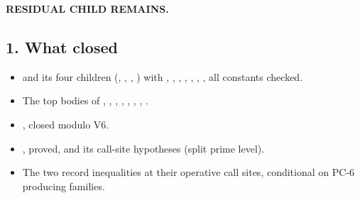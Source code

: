 \documentclass[11pt]{article}
\newcommand{\PC}[1]{\textsf{PC-#1}}
\begin{document}
\textbf{RESIDUAL CHILD REMAINS.}

\subsection*{1. What closed}
\begin{itemize}[leftmargin=*]
\item {} and its four children (, , , ) with , , , , , , , all constants checked.
\item The top bodies of , , , , , , , .
\item {}, closed modulo V6.
\item {}, proved, and its call-site hypotheses (split prime level).
\item The two record inequalities at their operative call sites, conditional on \PC{6} producing  families.
\end{itemize}
\end{document}
